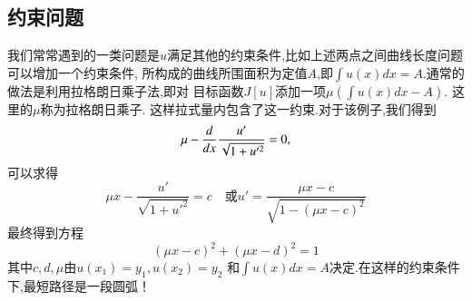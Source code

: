 \subsection{约束问题}
我们常常遇到的一类问题是$u$满足其他的约束条件,比如上述两点之间曲线长度问题可以增加一个约束条件,
所构成的曲线所围面积为定值$A$,即$\int u(x) dx = A$.通常的做法是利用拉格朗日乘子法,即对
目标函数$J[u]$添加一项$\mu\left( \int u(x) dx - A \right)$. 这里的$\mu$称为拉格朗日乘子.
这样拉式量内包含了这一约束.对于该例子,我们得到
\[
  \mu - \frac{d{}}{d{x}} \frac{u'}{\sqrt{1 + u'^2}} = 0,
\]
可以求得
\[
  \mu x-\frac{u'}{\sqrt{1+u'^2}}=c \quad \textrm{或} u'=\frac{\mu x-c}{\sqrt{1-(\mu x-c)^2}}
 \]
最终得到方程
\[
  (\mu x - c)^2 + (\mu x -d)^2 = 1
\]
其中$c,d,\mu$由$u(x_1)=y_1, u(x_2) = y_2$ 和$\int u(x) dx = A$决定.在这样的约束条件下,最短路径是一段圆弧！

